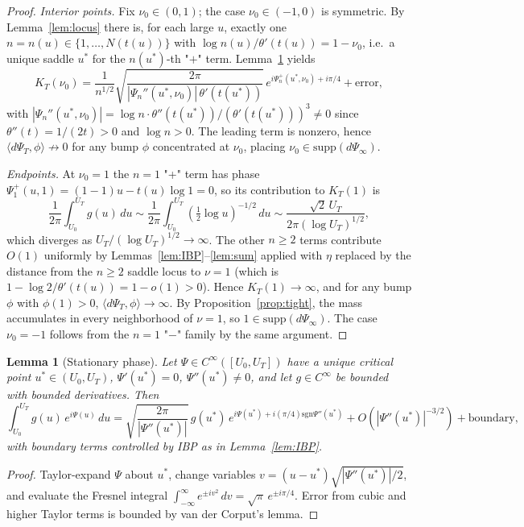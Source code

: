 \documentclass[11pt]{article}
\newtheorem{lemma}[theorem]{Lemma}
\theoremstyle{definition}
\theoremstyle{remark}
\begin{document}
\begin{proof}
\emph{Interior points.}  Fix $\nu_0\in(0,1)$; the case $\nu_0\in(-1,0)$
is symmetric.  By Lemma~\ref{lem:locus} there is, for each large $u$,
exactly one $n=n(u)\in\{1,\dots,N(t(u))\}$ with
$\log n(u)/\theta'(t(u))=1-\nu_0$, i.e.\ a unique saddle $u^*$ for the
$n(u^*)$-th "$+$" term.  Lemma~\ref{lem:stph} yields
\[
  K_T(\nu_0)
  =\frac{1}{n^{1/2}}\sqrt{\frac{2\pi}{|\Psi_n''(u^*,\nu_0)|\,\theta'(t(u^*))}}\,
    e^{i\Psi_n^+(u^*,\nu_0)+i\pi/4}
  +\text{error},
\]
with $|\Psi_n''(u^*,\nu_0)|=\log n\cdot\theta''(t(u^*))/(\theta'(t(u^*)))^3\ne0$
since $\theta''(t)=1/(2t)>0$ and $\log n>0$.  The leading term is
nonzero, hence $\langle d\Psi_T,\phi\rangle\not\to 0$ for any bump
$\phi$ concentrated at $\nu_0$, placing $\nu_0\in\mathrm{supp}(d\Psi_\infty)$.

\emph{Endpoints.}  At $\nu_0=1$ the $n=1$ "+" term has phase
$\Psi_1^+(u,1)=(1-1)u-t(u)\log 1=0$, so its contribution to $K_T(1)$ is
\[
  \frac{1}{2\pi}\int_{U_0}^{U_T}g(u)\,du
  \sim\frac{1}{2\pi}\int_{U_0}^{U_T}(\tfrac12\log u)^{-1/2}\,du
  \sim\frac{\sqrt{2}\,U_T}{2\pi(\log U_T)^{1/2}},
\]
which diverges as $U_T/(\log U_T)^{1/2}\to\infty$.  The other $n\ge 2$
terms contribute $O(1)$ uniformly by Lemmas~\ref{lem:IBP}--\ref{lem:sum}
applied with $\eta$ replaced by the distance from the $n\ge 2$ saddle
locus to $\nu=1$ (which is $1-\log 2/\theta'(t(u))=1-o(1)>0$).  Hence
$K_T(1)\to\infty$, and for any bump $\phi$ with $\phi(1)>0$,
$\langle d\Psi_T,\phi\rangle\to\infty$.  By
Proposition~\ref{prop:tight}, the mass accumulates in every
neighborhood of $\nu=1$, so $1\in\mathrm{supp}(d\Psi_\infty)$.  The
case $\nu_0=-1$ follows from the $n=1$ "$-$" family by the same
argument.
\end{proof}

\begin{lemma}[Stationary phase]\label{lem:stph}
Let $\Psi\in C^\infty([U_0,U_T])$ have a unique critical point
$u^*\in(U_0,U_T)$, $\Psi'(u^*)=0$, $\Psi''(u^*)\ne 0$, and let
$g\in C^\infty$ be bounded with bounded derivatives.  Then
\[
  \int_{U_0}^{U_T}g(u)\,e^{i\Psi(u)}\,du
  =\sqrt{\frac{2\pi}{|\Psi''(u^*)|}}\,g(u^*)\,
    e^{i\Psi(u^*)+i(\pi/4)\mathrm{sgn}\Psi''(u^*)}
  +O\!\left(|\Psi''(u^*)|^{-3/2}\right)
  +\text{boundary},
\]
with boundary terms controlled by IBP as in Lemma~\ref{lem:IBP}.
\end{lemma}

\begin{proof}
Taylor-expand $\Psi$ about $u^*$, change variables
$v=(u-u^*)\sqrt{|\Psi''(u^*)|/2}$, and evaluate the Fresnel integral
$\int_{-\infty}^\infty e^{\pm iv^2}\,dv=\sqrt{\pi}\,e^{\pm i\pi/4}$.
Error from cubic and higher Taylor terms is bounded by van der
Corput's lemma.
\end{proof}
\end{document}
